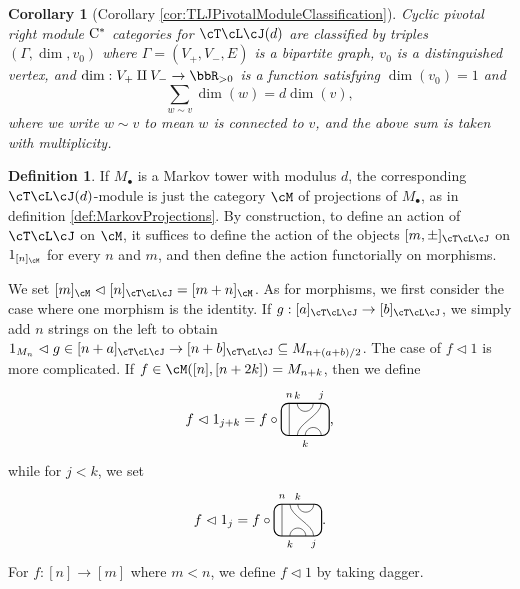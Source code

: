 \documentclass[11pt]{article}
\theoremstyle{plain}
\newtheorem*{cor*}{Corollary}
\theoremstyle{definition}
\newtheorem{defn}[thm]{Definition}
\newcommand{\Cstar}{\rm{C^*}}
\newcommand{\TLJ}{\cT\cL\cJ}
\newcommand{\TLPlusPIso}[3]{
 \TLTStart
 \TLTThrough{#1}
 \TLTSnakeR{#2}{#3}
 \TLTEnd
}
\newcommand{\TLMinusPIso}[3]{
 \TLTStart
 \TLTThrough{#1}
 \TLTSnakeL{#2}{#3}
 \TLTEnd
}
\newcommand{\TLTCalcLabelOffset}[3][0cm]{
 \settowidth{#2}{\scriptsize{$#3$}}
 \setlength{#2}{.5#2}
 \setlength{#2}{\maxof{#2}{#1}}
}
\newcommand{\TLTEnd}{
 \draw[thick, rounded corners = 5pt] (0,0) rectangle ($ (TLTlead) + (0,.8) $);
 \end{tikzpicture}
}
\newcommand{\TLTStart}{
 \begin{tikzpicture}[baseline=.3cm]
 \coordinate (TLTlead) at (.2,0); %
 \let\TLTlabelwidth\relax
 \newlength{\TLTlabelwidth}
}
\newcommand{\TLTThrough}[1]{
 \TLTCalcLabelOffset[.2cm]{\TLTlabelwidth}{#1}
 \coordinate (TLTlead) at ($ (TLTlead) + ({\TLTlabelwidth},0) $);
 \begin{scope}[shift=(TLTlead)]
  \draw (0,0) -- (0,.8);
  \node at (0,1) {\scriptsize{$#1$}};
 \end{scope}
  \coordinate (TLTlead) at ($ (TLTlead) + ({\TLTlabelwidth},0) $);
}
\newcommand{\TLTSnakeR}[2]{
 \let\TLTscwidth\relax
 \newlength{\TLTscwidth}
 \let\TLTsswidth\relax
 \newlength{\TLTsswidth}
 \TLTCalcLabelOffset[.2cm]{\TLTscwidth}{#1}
 \TLTCalcLabelOffset[.5cm]{\TLTsswidth}{#2}
 \setlength{\TLTlabelwidth}{\TLTscwidth+\TLTsswidth}
 \setlength{\TLTlabelwidth}{\maxof{\TLTlabelwidth}{.7cm}} %
 \coordinate (TLTlead) at ($ (TLTlead) + ({\TLTscwidth},0) $);
 \begin{scope}[shift=(TLTlead)]
  \draw (.1,.8) arc (-180:0:.2cm);
  \draw (.1,0) .. controls ++(90:.3cm) and ++(270:.3cm) .. ($ (.1,.8) + ({\TLTlabelwidth},0) $);
  \draw ($ (.1,0) + ({\TLTsswidth},0) $) arc (180:0:.2cm);
  \node at (.1,1) {\scriptsize{$#1$}};
  \node at ($ (.1,1) + ({\TLTlabelwidth},0) $) {\scriptsize{$#2$}};
  \node at ($ (.1,-.2) + ({\TLTsswidth},0) $) {\scriptsize{$#1$}};
 \end{scope}
 \coordinate (TLTlead) at ($ (TLTlead) + ({\TLTlabelwidth+\TLTsswidth},0) $);
}
\newcommand{\TLTSnakeL}[2]{
 \let\TLTscwidth\relax
 \newlength{\TLTscwidth}
 \let\TLTsswidth\relax
 \newlength{\TLTsswidth}
 \TLTCalcLabelOffset[.2cm]{\TLTscwidth}{#1}
 \TLTCalcLabelOffset[.1cm]{\TLTsswidth}{#2}
 \setlength{\TLTlabelwidth}{\TLTscwidth+\TLTsswidth}
 \setlength{\TLTlabelwidth}{\maxof{\TLTlabelwidth}{.5cm}} %
 \coordinate (TLTlead) at ($ (TLTlead) + ({\TLTsswidth},0) $);
 \begin{scope}[shift=(TLTlead)]
  \draw ($ (.1,.8) + ({\TLTsswidth+\TLTscwidth},0) $) arc (-180:0:.2cm);
  \draw ($ (.1,0) + ({\TLTlabelwidth},0) $) .. controls ++(90:.3cm) and ++(270:.3cm) .. (.1,.8);
  \draw (.1,0) arc (180:0:.2cm);
  \node at ($ (.1,1) + ({\TLTsswidth+\TLTscwidth},0) $) {\scriptsize{$#1$}};
  \node at (.1,1) {\scriptsize{$#2$}};
  \node at (.1,-.2) {\scriptsize{$#1$}};
 \end{scope}
 \setlength{\TLTscwidth}{\maxof{\TLTscwidth}{.5cm}} %
 \coordinate (TLTlead) at ($ (TLTlead) + ({\TLTlabelwidth+\TLTscwidth},0) $);
}
\begin{document}
\begin{cor*}[Corollary \ref{cor:TLJPivotalModuleClassification}]
Cyclic pivotal right module $\Cstar$ categories for $\cT\cL\cJ(d)$ are classified by triples $(\Gamma, \dim, v_0)$ where $\Gamma=(V_+, V_- , E)$ is a bipartite graph, $v_0$ is a distinguished vertex, and $\dim : V_+\amalg V_- \to \bbR_{>0}$ is a function satisfying $\dim(v_0) = 1$ and
$$
\sum_{w\sim v} \dim(w) = d \dim(v),
$$
where we write $w\sim v$ to mean $w$ is connected to $v$, and the above sum is taken with multiplicity.
\end{cor*}

\begin{defn}
\label{def:ModuleFromMarkovTower}
 If $M_\bullet$ is a Markov tower with modulus $d$, the corresponding $\cT\cL\cJ(d)$-module is just the category $\cM$ of projections of $M_\bullet$, as in definition \ref{def:MarkovProjections}. By construction, to define an action of $\TLJ$ on $\cM$, it suffices to define the action of the objects $[m,\pm]_{\cT\cL\cJ}$ on $1_{[n]_\cM}$ for every $n$ and $m$, and then define the action functorially on morphisms. 
 
We set $[m]_\cM\vartriangleleft [n]_{\TLJ}=[m+n]_\cM$. 
As for morphisms, we first consider the case where one morphism is the identity. 
 If $g:[a]_{\TLJ}\to[b]_{\TLJ}$, we simply add $n$ strings on the left to obtain $1_{M_n}\vartriangleleft g\in[n+a]_{\TLJ}\to[n+b]_{\TLJ}\subseteq M_{n+(a+b)/2}$. %
 The case of $f\vartriangleleft 1$ is more complicated. If $f\in \cM([n],[n+2k])=M_{n+k}$, then we define 
\[f\vartriangleleft 1_{j+k}=f\circ
 \begin{tikzpicture}[baseline=.3cm]
  \draw (.2,0) -- (.2,.8);
  \node at (.2,1) {\scriptsize{$n$}};
  \draw (.6,0) arc (180:0:.2cm);
  \node at (.6,-.2) {\scriptsize{$k$}};
  \draw (.4,0) .. controls ++(90:.3cm) and ++(270:.3cm) .. (1,.8);
  \node at (1,1) {\scriptsize{$j$}};
  \draw (.4,.8) arc (-180:0:.2cm);
  \node at (.4,1) {\scriptsize{$k$}};
  \draw[thick, rounded corners = 5pt] (0,0) rectangle (1.2,.8);
 \end{tikzpicture}
 \text{,}\]
while for $j<k$, we set 
\[f\vartriangleleft 1_j=f\circ
 \begin{tikzpicture}[baseline=.3cm]
  \draw (.2,0) -- (.2,.8);
  \node at (.2,1) {\scriptsize{$n$}};
  \draw (.4,0) arc (180:0:.2cm);
  \node at (.4,-.2) {\scriptsize{$k$}};
  \draw (1,0) .. controls ++(90:.3cm) and ++(270:.3cm) .. (.4,.8);
  \node at (1,-.2) {\scriptsize{$j$}};
  \draw (.6,.8) arc (-180:0:.2cm);
  \node at (.6,1) {\scriptsize{$k$}};
  \draw[thick, rounded corners = 5pt] (0,0) rectangle (1.2,.8);
 \end{tikzpicture}
 \text{.}\]
For $f:[n]\to[m]$ where $m<n$, we define $f\vartriangleleft 1$ by taking dagger. 


\end{defn}
\end{document}
